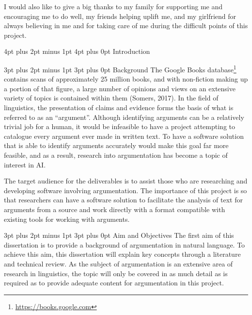 \documentclass[12pt,a4paper]{article}
\makeatletter
\renewcommand\subsection{\@startsection {subsection}{1}{2mm} %
                               {3pt plus 2pt minus 1pt} %
                               {3pt plus 0pt} %
                               {\normalfont\bfseries}}
\renewcommand\section{\@startsection {section}{1}{0mm} %
                               {4pt plus 2pt minus 1pt} %
                               {4pt plus 0pt} %
                               {\bfseries}}
\makeatother
\begin{document}
	I would also like to give a big thanks to my family for supporting me and encouraging me to do well, my friends helping uplift me, and my girlfriend for always believing in me and for taking care of me during the difficult points of this project.
\newpage


\section{Introduction}

\subsection{Background}
The Google Books database\footnote{\url{https://books.google.com}} contains scans of approximately 25 million books, and with non-fiction making up a portion of that figure, a large number of opinions and views on an extensive variety of topics is contained within them (Somers, 2017). In the field of linguistics, the presentation of claims and evidence forms the basis of what is referred to as an ``argument''. Although identifying arguments can be a relatively trivial job for a human, it would be infeasible to have a project attempting to catalogue every argument ever made in written text. To have a software solution that is able to identify arguments accurately would make this goal far more feasible, and as a result, research into argumentation has become a topic of interest in AI.

The target audience for the deliverables is to assist those who are researching and developing software involving argumentation. The importance of this project is so that researchers can have a software solution to facilitate the analysis of text for arguments from a source and work directly with a format compatible with existing tools for working with arguments.\newline

\subsection{Aim and Objectives}
The first aim of this dissertation is to provide a background of argumentation in natural language. To achieve this aim, this dissertation will explain key concepts through a literature and technical review. As the subject of argumentation is an extensive area of research in linguistics, the topic will only be covered in as much detail as is required as to provide adequate content for argumentation in this project.
\end{document}
